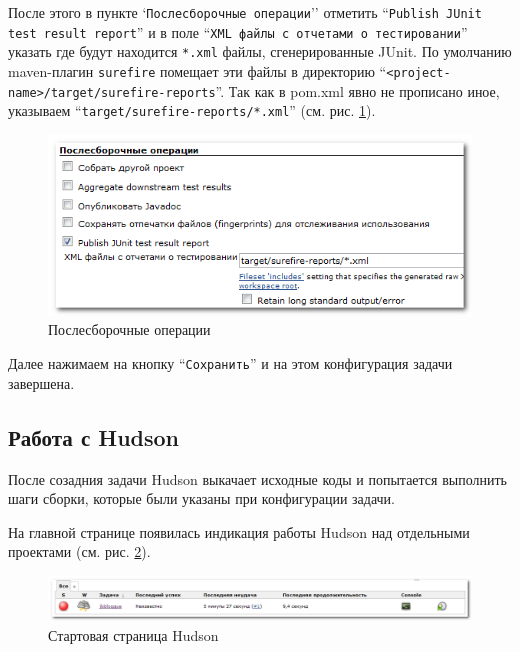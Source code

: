 \documentclass[a4paper,12pt]{article}
\begin{document}
После этого в пункте `\texttt{Послесборочные операции}'' отметить ``\texttt{Publish JUnit test result report}'' и в поле
``\texttt{XML файлы с отчетами о тестировании}'' указать где будут находится \texttt{*.xml} файлы, сгенерированные JUnit. 
По умолчанию maven-плагин \texttt{surefire} помещает эти файлы в директорию
``\texttt{<project-name>/target/surefire-reports}''.
Так как в pom.xml явно не прописано иное, указываем ``\texttt{target/surefire-reports/*.xml}'' (см. рис.
\ref{pic.hudson.job.after-build}).

\begin{figure}[htp]
\begin{center}
  \includegraphics[scale = 0.6]{new-job-6.png}
  \vspace{-10pt}
  \caption{Послесборочные операции}
  \label{pic.hudson.job.after-build}
\end{center}
\end{figure}

Далее нажимаем на кнопку ``\texttt{Сохранить}'' и на этом конфигурация задачи завершена. 

\subsection{Работа с Hudson}

После созадния задачи Hudson выкачает исходные коды и попытается выполнить шаги сборки, которые были указаны при
конфигурации задачи.

На главной странице появилась индикация работы Hudson над отдельными проектами (см. рис. \ref{pic.hudson.start-page}).

\begin{figure}[htp]
\begin{center}
  \includegraphics[scale = 0.65]{job-1.png}
  \vspace{-20pt}
  \caption{Стартовая страница Hudson}
  \label{pic.hudson.start-page}
\end{center}
\end{figure}
\end{document}

